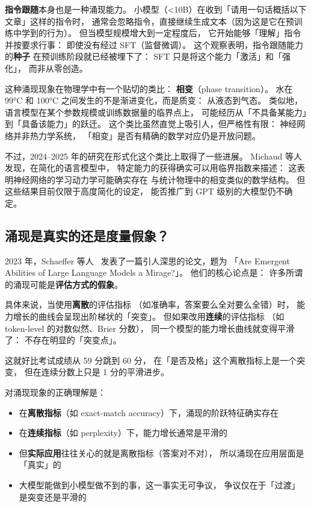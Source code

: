 \textbf{指令跟随}本身也是一种涌现能力。
小模型（<10B）在收到「请用一句话概括以下文章」这样的指令时，
通常会忽略指令，直接继续生成文本（因为这是它在预训练中学到的行为）。
但当模型规模增大到一定程度后，
它开始能够「理解」指令并按要求行事：
即使没有经过 SFT（监督微调）。
这个观察表明，指令跟随能力的\textbf{种子}
在预训练阶段就已经被埋下了：
SFT 只是将这个能力「激活」和「强化」，
而非从零创造。

这种涌现现象在物理学中有一个贴切的类比：
\textbf{相变}（phase transition）。
水在 99°C 和 100°C 之间发生的不是渐进变化，而是质变：
从液态到气态。
类似地，语言模型在某个参数规模或训练数据量的临界点上，
可能经历从「不具备某能力」到「具备该能力」的跃迁。
这个类比虽然直觉上吸引人，但严格性有限：
神经网络并非热力学系统，
「相变」是否有精确的数学对应仍是开放问题。

不过，2024--2025 年的研究在形式化这个类比上取得了一些进展。
Michaud 等人发现，在简化的语言模型中，
特定能力的获得确实可以用临界指数来描述：
这表明神经网络的学习动力学可能确实存在
与统计物理中的相变类似的数学结构。
但这些结果目前仅限于高度简化的设定，
能否推广到 GPT 级别的大模型仍不确定。

\subsection{涌现是真实的还是度量假象？}

2023 年，Schaeffer 等人~\cite{schaeffer2023mirage}
发表了一篇引人深思的论文，题为
「Are Emergent Abilities of Large Language Models a Mirage?」。
他们的核心论点是：
许多所谓的涌现可能是\textbf{评估方式的假象}。

具体来说，当使用\textbf{离散}的评估指标
（如准确率，答案要么全对要么全错）时，
能力增长的曲线会呈现出阶梯状的「突变」。
但如果改用\textbf{连续}的评估指标
（如 token-level 的对数似然、Brier 分数），
同一个模型的能力增长曲线就变得平滑了：
不存在明显的「突变点」。

这就好比考试成绩从 59 分跳到 60 分，
在「是否及格」这个离散指标上是一个突变，
但在连续分数上只是 1 分的平滑进步。

\begin{warnbox}[涌现之争的现状]
对涌现现象的正确理解是：
\begin{itemize}[noitemsep]
  \item 在\textbf{离散指标}（如 exact-match accuracy）下，涌现的阶跃特征确实存在
  \item 在\textbf{连续指标}（如 perplexity）下，能力增长通常是平滑的
  \item 但\textbf{实际应用}往往关心的就是离散指标（答案对不对），
        所以涌现在应用层面是「真实」的
  \item 大模型能做到小模型做不到的事，这一事实无可争议，
        争议仅在于「过渡」是突变还是平滑的
\end{itemize}
\end{warnbox}

